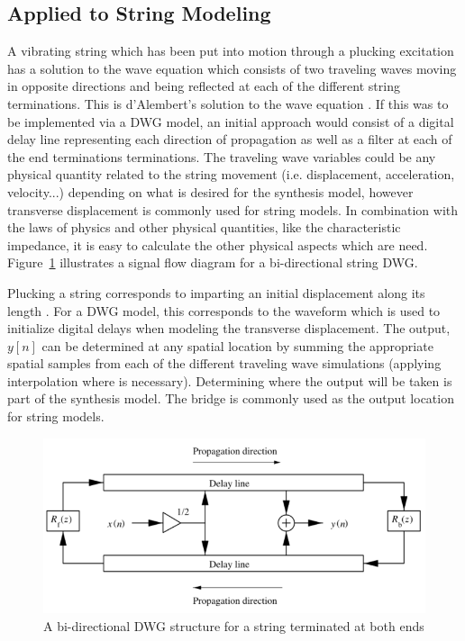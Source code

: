 \documentclass[main.tex]{subfiles}
\begin{document}
\subsection{Applied to String Modeling}
A vibrating string which has been put into motion through a plucking excitation has a solution to the wave equation which consists of two traveling waves moving in opposite directions and being reflected at each of the different string terminations. This is d'Alembert's solution to the wave equation . If this was to be implemented via a DWG model, an initial approach would consist of a digital delay line representing each direction of propagation as well as a filter at each of the end terminations terminations. The traveling wave variables could be any physical quantity related to the string movement (i.e. displacement, acceleration, velocity...) depending on what is desired for the synthesis model, however transverse displacement is commonly used for string models. In combination with the laws of physics and other physical quantities, like the characteristic impedance, it is easy to calculate the other physical aspects which are need. Figure~\ref{fig:BiDirectionDWG} illustrates a signal flow diagram for a bi-directional string DWG.

Plucking a string corresponds to imparting an initial displacement along its length . For a DWG model, this corresponds to the waveform which is used to initialize digital delays when modeling the transverse displacement. The output, $y[n]$ can be determined at any spatial location by summing the appropriate spatial samples from each of the different traveling wave simulations (applying interpolation where is necessary). Determining where the output will be taken is part of the synthesis model. The bridge is commonly used as the output location for string models.

\begin{figure}[h]
    \centering
    \includegraphics[scale=.85]{./images/diagrams/BiDirectionalDWG1.png}
    \caption{A bi-directional DWG structure for a string terminated at both ends }
    \label{fig:BiDirectionDWG}
\end{figure}
\end{document}
